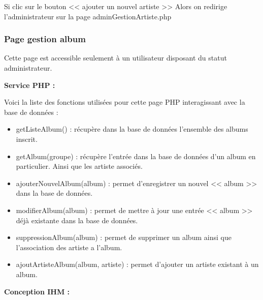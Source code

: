 			\begin{paragraphe}
				Si clic sur le bouton << ajouter un nouvel artiste >>
				Alors on redirige l'administrateur sur la page adminGestionArtiste.php
			\end{paragraphe}

		\subsubsection{Page gestion album}

			\begin{paragraphe}
				Cette page est accessible seulement à un utilisateur disposant du statut administrateur.
			\end{paragraphe}

			\begin{paragraphe}
				\textbf{Service PHP :}
			\end{paragraphe}

			\begin{paragraphe}
				Voici la liste des fonctions utilisées pour cette page PHP interagissant avec la base de données :
			\end{paragraphe}

			\begin{paragraphe}
				\begin{itemize}
					\item getListeAlbum() : récupère dans la base de données l'ensemble des albums inscrit.
					\item getAlbum(groupe) : récupère l'entrée dans la base de données d'un album en particulier. Ainsi que les artiste associés.
					\item ajouterNouvelAlbum(album) : permet d'enregistrer un nouvel << album >> dans la base de données.
					\item modifierAlbum(album) : permet de mettre à jour une entrée << album >> déjà existante dans la base de données.
					\item suppressionAlbum(album) : permet de supprimer un album ainsi que l'association des artiste a l'album.
					\item ajoutArtisteAlbum(album, artiste) : permet d'ajouter un artiste existant à un album.
				\end{itemize}
			\end{paragraphe}

			\begin{paragraphe}
				\textbf{Conception IHM :}
			\end{paragraphe}

